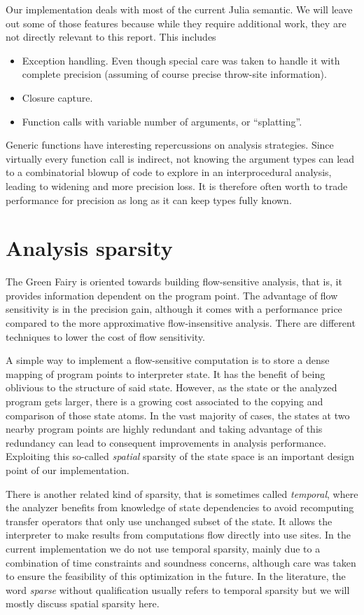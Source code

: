 \documentclass[11pt]{article}
\begin{document}
Our implementation deals with most of the current Julia semantic.
We will leave out some of those features because while they require additional work, they are not directly relevant to this report. This includes
\begin{itemize}
\item Exception handling. Even though special care was taken to handle it with complete precision (assuming of course precise throw-site information).
\item Closure capture.
\item Function calls with variable number of arguments, or ``splatting''.
\end{itemize}

Generic functions have interesting repercussions on analysis strategies. Since virtually every function call is indirect, not knowing the argument types can lead to a combinatorial blowup of code to explore in an interprocedural analysis, leading to widening and more precision loss. It is therefore often worth to trade performance for precision as long as it can keep types fully known\cite{jeff-phd}.

\section*{Analysis sparsity}

The Green Fairy is oriented towards building flow-sensitive analysis, that is, it provides information dependent on the program point.
The advantage of flow sensitivity is in the precision gain, although it comes with a performance price compared to the more approximative flow-insensitive analysis.
There are different techniques to lower the cost of flow sensitivity.

A simple way to implement a flow-sensitive computation is to store a dense mapping of program points to interpreter state. It has the benefit of being oblivious to the structure of said state.
However, as the state or the analyzed program gets larger, there is a growing cost associated to the copying and comparison of those state atoms.
In the vast majority of cases, the states at two nearby program points are highly redundant and taking advantage of this redundancy can lead to consequent improvements in analysis performance. Exploiting this so-called \emph{spatial} sparsity of the state space is an important design point of our implementation.

There is another related kind of sparsity, that is sometimes called \emph{temporal}, where the analyzer benefits from knowledge of state dependencies to avoid recomputing transfer operators that only use unchanged subset of the state. It allows the interpreter to make results from computations flow directly into use sites.
In the current implementation we do not use temporal sparsity, mainly due to a combination of time constraints and soundness concerns, although care was taken to ensure the feasibility of this optimization in the future.
In the literature, the word \emph{sparse} without qualification usually refers to temporal sparsity but we will mostly discuss spatial sparsity here.
\end{document}
